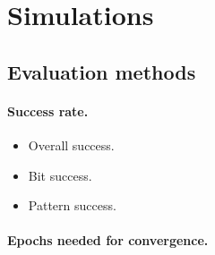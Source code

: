 
\section{Simulations}

 

\subsection{Evaluation methods} 

\paragraph{Success rate.} 

\begin{itemize}
\item Overall success. 
\item Bit success. 
\item Pattern success. 
\end{itemize} 

\paragraph{Epochs needed for convergence.} 



